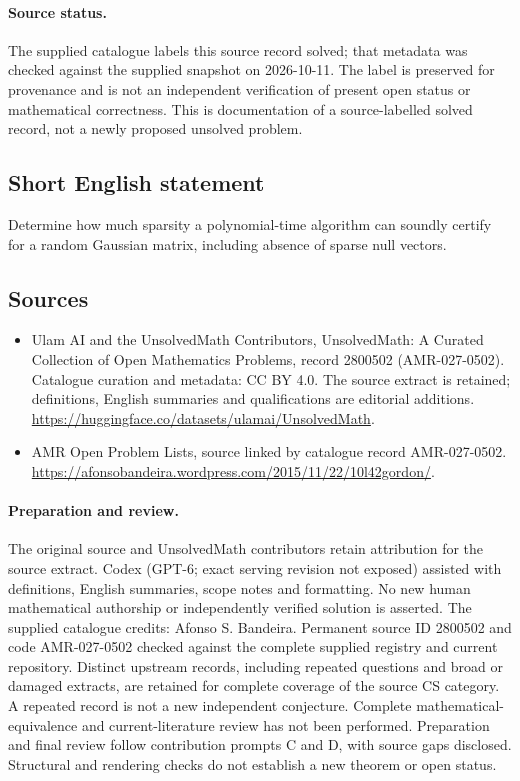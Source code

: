 \documentclass[11pt]{article}
\begin{document}
\paragraph{Source status.}
The supplied catalogue labels this source record solved; that metadata was checked against the supplied snapshot on 2026-10-11. The label is preserved for provenance and is not an independent verification of present open status or mathematical correctness. This is documentation of a source-labelled solved record, not a newly proposed unsolved problem.
\subsection{Short English statement}
Determine how much sparsity a polynomial-time algorithm can soundly certify for a random Gaussian matrix, including absence of sparse null vectors.
\subsection{Sources}
\begin{itemize}
\item[\hypertarget{source:2800502:1}{S1}] Ulam AI and the UnsolvedMath Contributors, UnsolvedMath: A Curated Collection of Open Mathematics Problems, record 2800502 (AMR-027-0502). Catalogue curation and metadata: CC BY 4.0. The source extract is retained; definitions, English summaries and qualifications are editorial additions.
\url{https://huggingface.co/datasets/ulamai/UnsolvedMath}.
\item[\hypertarget{source:2800502:2}{S2}] AMR Open Problem Lists, source linked by catalogue record AMR-027-0502.
\url{https://afonsobandeira.wordpress.com/2015/11/22/10l42gordon/}.
\end{itemize}
\paragraph{Preparation and review.}
The original source and UnsolvedMath contributors retain attribution for the source extract. Codex (GPT-6; exact serving revision not exposed) assisted with definitions, English summaries, scope notes and formatting. No new human mathematical authorship or independently verified solution is asserted. The supplied catalogue credits: Afonso S. Bandeira. Permanent source ID 2800502 and code AMR-027-0502 checked against the complete supplied registry and current repository. Distinct upstream records, including repeated questions and broad or damaged extracts, are retained for complete coverage of the source CS category. A repeated record is not a new independent conjecture. Complete mathematical-equivalence and current-literature review has not been performed. Preparation and final review follow contribution prompts C and D, with source gaps disclosed. Structural and rendering checks do not establish a new theorem or open status.
\label{end:2800502}
\end{document}
